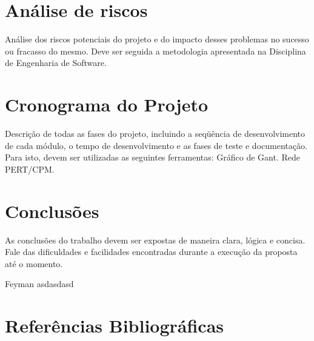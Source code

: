 \documentclass[a4paper,12pt]{article}
\begin{document}
\section{Análise de riscos}
Análise dos riscos potenciais do projeto e do impacto desses problemas no sucesso ou fracasso do mesmo. Deve ser seguida a metodologia apresentada na Disciplina de Engenharia de Software.


\section{Cronograma do Projeto}
Descrição de todas as fases do projeto, incluindo a seqüência de desenvolvimento de cada módulo, o tempo de desenvolvimento e as fases de teste e documentação. Para isto, devem ser utilizadas as seguintes ferramentas:
Gráfico de Gant.
Rede PERT/CPM.

\section{Conclusões}
As conclusões do trabalho devem ser expostas de maneira clara, lógica e concisa. Fale das dificuldades e facilidades encontradas durante a execução da proposta até o momento.

Feyman asdasdasd \cite{altieri1}
%
\renewcommand\refname{}


\newpage
\section{Referências Bibliográficas}
\renewcommand\refname{}

%
%
\end{document}
